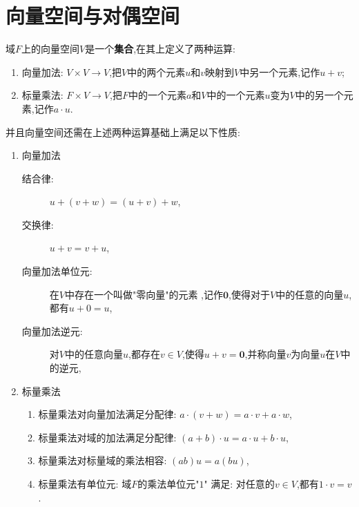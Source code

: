 \section{向量空间与对偶空间}
\begin{definition}
    域$F$上的向量空间$V$是一个{\color{magenta}\textbf{集合}},在其上定义了两种运算:
    \begin{enumerate}       
        \item 向量加法: $V\times V\to V$,把$V$中的两个元素$u$和$v$映射到$V$中另一个元素,记作$u+v$;
        \item 标量乘法: $F\times V\to V$,把$F$中的一个元素$a$和$V$中的一个元素$u$变为$V$中的另一个元素,记作$a\cdot u$.
    \end{enumerate}     
    并且向量空间还需在上述两种运算基础上满足以下性质:
    \begin{enumerate}
        \item 向量加法
        \begin{description}   
            \item[结合律:] $u+(v+w)=(u+v)+w$,
            \item[交换律:] $u+v=v+u$, 
            \item[向量加法单位元:] 在$V$中存在一个叫做"零向量"的元素 ,记作$\bm{0}$,使得对于$V$中的任意的向量$u$,都有$u+0=u$,
            \item[向量加法逆元:] 对$V$中的任意向量$u$,都存在$v\in V$,使得$u+v=\bm{0}$,并称向量$v$为向量$u$在$V$中的逆元,
        \end{description} 
        \item 标量乘法
        \begin{enumerate}
            \item 标量乘法对向量加法满足分配律: $a\cdot (v+w)=a\cdot v+a\cdot w$,
            \item 标量乘法对域的加法满足分配律: $(a+b)\cdot u=a\cdot u+b\cdot u$,
            \item 标量乘法对标量域的乘法相容: $(ab)u=a(bu)$,
            \item 标量乘法有单位元: 域$F$的乘法单位元"$1$" 满足: 对任意的$v\in V$,都有$1\cdot v=v$.
        \end{enumerate}
    \end{enumerate}
\end{definition}























































